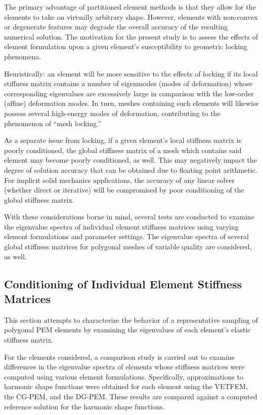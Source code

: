 The primary advantage of partitioned element methods is that they allow for the elements to take on virtually arbitrary shape. However, elements with non-convex or degenerate features may degrade the overall accuracy of the resulting numerical solution. The motivation for the present study is to assess the effects of element formulation upon a given element's susceptibility to geometric locking phenomena.

Heuristically: an element will be more sensitive to the effects of locking if its local stiffness matrix contains a number of eigenmodes (modes of deformation) whose corresponding eigenvalues are excessively large in comparison with the low-order (affine) deformation modes. In turn, meshes containing such elements will likewise possess several high-energy modes of deformation, contributing to the phenomenon of ``mesh locking.''

As a separate issue from locking, if a given element's local stiffness matrix is poorly conditioned, the global stiffness matrix of a mesh which contains said element may become poorly conditioned, as well. This may negatively impact the degree of solution accuracy that can be obtained due to floating point arithmetic. For implicit solid mechanics applications, the accuracy of any linear solver (whether direct or iterative) will be compromised by poor conditioning of the global stiffness matrix.

With these considerations borne in mind, several tests are conducted to examine the eigenvalue spectra of individual element stiffness matrices using varying element formulations and parameter settings. The eigenvalue spectra of several global stiffness matrices for polygonal meshes of variable quality are considered, as well.

\subsection*{Conditioning of Individual Element Stiffness Matrices}

This section attempts to characterize the behavior of a representative sampling of polygonal PEM elements by examining the eigenvalues of each element's elastic stiffness matrix.

For the elements considered, a comparison study is carried out to examine differences in the eigenvalue spectra of elements whose stiffness matrices were computed using various element formulations. Specifically, approximations to harmonic shape functions were obtained for each element using the VETFEM, the CG-PEM, and the DG-PEM. These results are compared against a computed reference solution for the harmonic shape functions.

